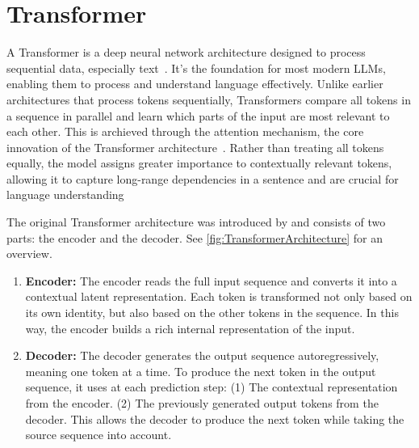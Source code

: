 \section{Transformer}
A Transformer is a deep neural network architecture designed to process sequential data, especially text~\cite{Vaswani2017AttentionIA}. It's the foundation for most modern LLMs, enabling them to process and understand language effectively.
Unlike earlier architectures that process tokens sequentially, Transformers compare all tokens in a sequence in parallel and learn which parts of the input are most relevant to each other. This is archieved through the attention mechanism, the core innovation of the Transformer architecture~\cite{Vaswani2017AttentionIA, AttentionTransformersStepbystep, TransformerExplainerLLM, Raschka2024BuildLLM}. 
Rather than treating all tokens equally, the model assigns greater importance to contextually relevant tokens, allowing it to capture long-range dependencies in a sentence and are crucial for language understanding

The original Transformer architecture was introduced by \textcite{Vaswani2017AttentionIA} and consists of two parts: the encoder and the decoder. See \autoref{fig:TransformerArchitecture} for an overview.
\begin{enumerate}
	\item \textbf{Encoder:} The encoder reads the full input sequence and converts it into a contextual latent representation. Each token is transformed not only based on its own identity, but also based on the other tokens in the sequence. In this way, the encoder builds a rich internal representation of the input.
	
	\item \textbf{Decoder:} The decoder generates the output sequence autoregressively, meaning one token at a time. To produce the next token in the output sequence, it uses at each prediction step: (1) The contextual representation from the encoder. (2) The previously generated output tokens from the decoder. This allows the decoder to produce the next token while taking the source sequence into account.
\end{enumerate}


